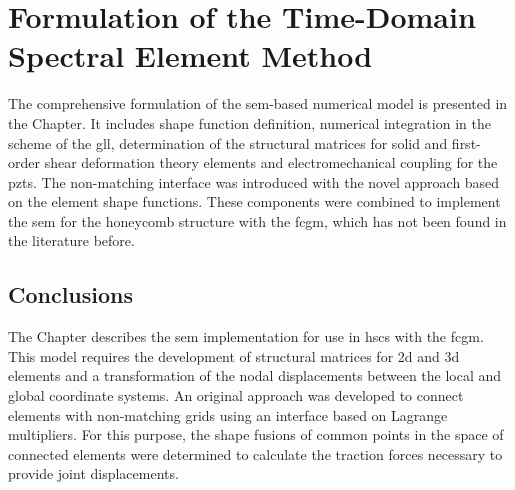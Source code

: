 
\chapter{Formulation of the Time-Domain Spectral Element Method}
\label{ch:sem}
The comprehensive formulation of the \ac{sem}-based numerical model is presented in the Chapter.
It includes shape function definition, numerical integration in the scheme of the \ac{gll}, determination of the structural matrices for solid and first-order shear deformation theory elements and electromechanical coupling for the \acp{pzt}.
The non-matching interface was introduced with the novel approach based on the element shape functions.
These components were combined to implement the \ac{sem} for the honeycomb structure with the \ac{fcgm}, which has not been found in the literature before.











\section{Conclusions}
\label{sec:conclusionsSEM}
The Chapter describes the \ac{sem} implementation for use in \acp{hsc} with the \ac{fcgm}.
This model requires the development of structural matrices for \ac{2d} and \ac{3d} elements and a transformation of the nodal displacements between the local and global coordinate systems.
An original approach was developed to connect elements with non-matching grids using an interface based on Lagrange multipliers.
For this purpose, the shape fusions of common points in the space of connected elements were determined to calculate the traction forces necessary to provide joint displacements.

